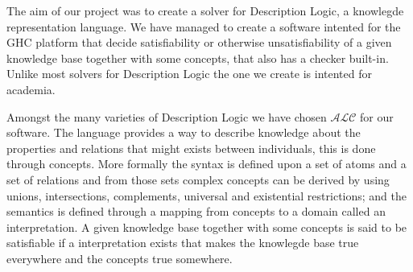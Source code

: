 The aim of our project was to create a solver for Description Logic, a
knowlegde representation language. We have managed to create a
software intented for the GHC platform that decide satisfiability or
otherwise unsatisfiability of a given knowledge base together with
some concepts, that also has a checker built-in. Unlike most solvers
for Description Logic the one we create is intented for academia.

Amongst the many varieties of Description Logic we have chosen
$\mathcal{ALC}$ for our software. The language provides a way to
describe knowledge about the properties and relations that might
exists between individuals, this is done through concepts. More
formally the syntax is defined upon a set of atoms and a set of
relations and from those sets complex concepts can be derived by using
unions, intersections, complements, universal and existential
restrictions; and the semantics is defined through a mapping from
concepts to a domain called an interpretation. A given knowledge base
together with some concepts is said to be satisfiable if a
interpretation exists that makes the knowlegde base true everywhere
and the concepts true somewhere.
